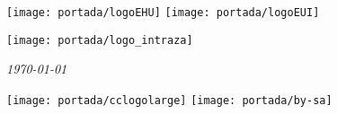 \begin{titlepage}
	\texttt{[image: portada/logoEHU]}
	\hspace{\fill}
	\texttt{[image: portada/logoEUI]}
	\vspace{1.5cm}
	\begin{center}
			
		\vskip1.5cm
		
		\Huge{\textbf{\thetitle}}
		
		\vskip1cm
		
		\texttt{[image: portada/logo\_intraza]}
		
		\vskip1.5cm
		
		\Large{\theauthor}
	
		\vskip 1cm
		
		\textit{\today}
	\end{center}
	\vspace{1.5cm}
	\hspace{\fill}
	\texttt{[image: portada/cclogolarge]}
	\hspace{1cm}
	\texttt{[image: portada/by-sa]}
	\hspace{\fill}
\end{titlepage}